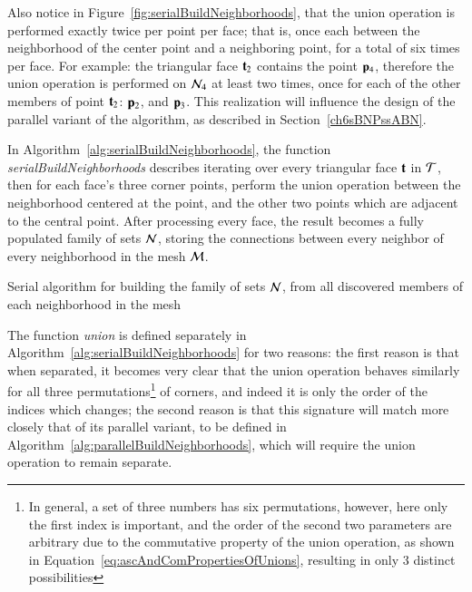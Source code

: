 Also notice in Figure~\ref{fig:serialBuildNeighborhoods}, that the union operation is performed exactly twice per point per face; that is, once each between the neighborhood of the center point and a neighboring point, for a total of six times per face. For example: the triangular face $\mathbf{t}_2$ contains the point $\mathbf{p}_4$, therefore the union operation is performed on $\mathcal{N}_4$ at least two times, once for each of the other members of point $\mathbf{t}_2$: $\mathbf{p}_2$, and $\mathbf{p}_3$. This realization will influence the design of the parallel variant of the algorithm, as described in Section~\ref{ch6sBNPssABN}.


In Algorithm~\ref{alg:serialBuildNeighborhoods}, the function \textit{serialBuildNeighborhoods} describes iterating over every triangular face $\mathbf{t}$ in $\mathcal{T}$, then for each face's three corner points, perform the union operation between the neighborhood centered at the point, and the other two points which are adjacent to the central point. After processing every face, the result becomes a fully populated family of sets $\mathcal{N}$, storing the connections between every neighbor of every neighborhood in the mesh $\mathcal{M}$.

\begin{algorithm}[ht]
	\DontPrintSemicolon


	\bigskip
\nl	{}

	\bigskip
\nl	{}
	\caption{Serial algorithm for building the family of sets $\mathcal{N}$, from all discovered members of each neighborhood in the mesh\label{alg:serialBuildNeighborhoods}}
\end{algorithm}%

The function \textit{union} is defined separately in Algorithm~\ref{alg:serialBuildNeighborhoods} for two reasons: the first reason is that when separated, it becomes very clear that the union operation behaves similarly for all three permutations\footnote{In general, a set of three numbers has six permutations, however, here only the first index is important, and the order of the second two parameters are arbitrary due to the commutative property of the union operation, as shown in Equation~\ref{eq:ascAndComPropertiesOfUnions}, resulting in only 3 distinct possibilities} of corners, and indeed it is only the order of the indices which changes; the second reason is that this signature will match more closely that of its parallel variant, to be defined in Algorithm~\ref{alg:parallelBuildNeighborhoods}, which will require the union operation to remain separate.

